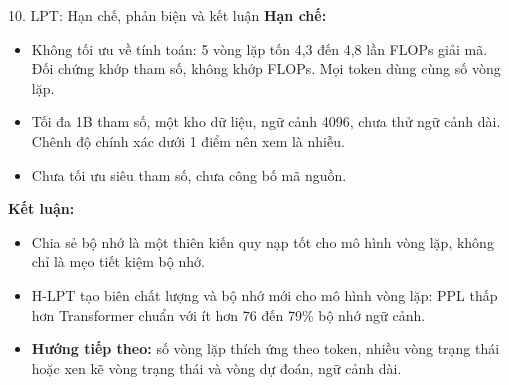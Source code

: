 \begin{frame}{10. LPT: Hạn chế, phản biện và kết luận}
    \textbf{Hạn chế:}
    \begin{itemize}
        \item Không tối ưu về tính toán: 5 vòng lặp tốn 4,3 đến 4,8 lần FLOPs giải mã. Đối chứng khớp tham số, không khớp FLOPs. Mọi token dùng cùng số vòng lặp.
        \item Tối đa 1B tham số, một kho dữ liệu, ngữ cảnh 4096, chưa thử ngữ cảnh dài. Chênh độ chính xác dưới 1 điểm nên xem là nhiễu.
        \item Chưa tối ưu siêu tham số, chưa công bố mã nguồn.
    \end{itemize}
    \vspace{0.1cm}
    \textbf{Kết luận:}
    \begin{itemize}
        \item Chia sẻ bộ nhớ là một thiên kiến quy nạp tốt cho mô hình vòng lặp, không chỉ là mẹo tiết kiệm bộ nhớ.
        \item H-LPT tạo biên chất lượng và bộ nhớ mới cho mô hình vòng lặp: PPL thấp hơn Transformer chuẩn với ít hơn 76 đến 79\% bộ nhớ ngữ cảnh.
        \item \textbf{Hướng tiếp theo:} số vòng lặp thích ứng theo token, nhiều vòng trạng thái hoặc xen kẽ vòng trạng thái và vòng dự đoán, ngữ cảnh dài.
    \end{itemize}
\end{frame}
